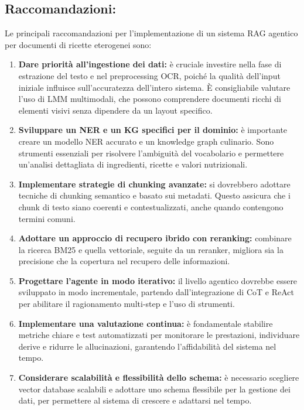 \documentclass[a4paper, 11pt]{article}
\begin{document}
\subsection*{Raccomandazioni:}
Le principali raccomandazioni per l'implementazione di un sistema RAG agentico per documenti di ricette eterogenei sono:
\begin{enumerate}[label=\arabic*.]
    \item \textbf{Dare priorità all'ingestione dei dati:} è cruciale investire nella fase di estrazione del testo e nel preprocessing OCR, poiché la qualità dell'input iniziale influisce sull'accuratezza dell'intero sistema. È consigliabile valutare l'uso di LMM multimodali, che possono comprendere documenti ricchi di elementi visivi senza dipendere da un layout specifico.
    \item \textbf{Sviluppare un NER e un KG specifici per il dominio:} è importante creare un modello NER accurato e un knowledge graph culinario. Sono strumenti essenziali per risolvere l'ambiguità del vocabolario e permettere un'analisi dettagliata di ingredienti, ricette e valori nutrizionali.
    \item \textbf{Implementare strategie di chunking avanzate:} si dovrebbero adottare tecniche di chunking semantico e basato sui metadati. Questo assicura che i chunk di testo siano coerenti e contestualizzati, anche quando contengono termini comuni.
    \item \textbf{Adottare un approccio di recupero ibrido con reranking:} combinare la ricerca BM25 e quella vettoriale, seguite da un reranker, migliora sia la precisione che la copertura nel recupero delle informazioni.
    \item \textbf{Progettare l'agente in modo iterativo:} il livello agentico dovrebbe essere sviluppato in modo incrementale, partendo dall'integrazione di CoT e ReAct per abilitare il ragionamento multi-step e l'uso di strumenti.
    \item \textbf{Implementare una valutazione continua:} è fondamentale stabilire metriche chiare e test automatizzati per monitorare le prestazioni, individuare derive e ridurre le allucinazioni, garantendo l'affidabilità del sistema nel tempo.
    \item \textbf{Considerare scalabilità e flessibilità dello schema:} è necessario scegliere vector database scalabili e adottare uno schema flessibile per la gestione dei dati, per permettere al sistema di crescere e adattarsi nel tempo.
\end{enumerate}



\end{document}
